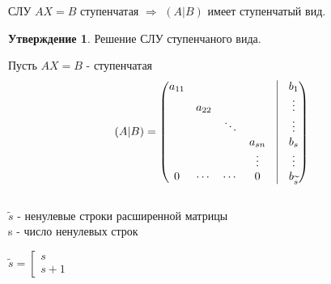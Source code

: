 \documentclass[a4paper, 12pt]{article}
\theoremstyle{definition}
\newtheorem*{subtheorem}{Утверждение}
\begin{document}
  СЛУ $AX=B$ ступенчатая $\Longrightarrow $ $(A|B)$ имеет ступенчатый вид.

  \newpage
  \begin{subtheorem}
    Решение СЛУ ступенчаного вида.
  \end{subtheorem}  
  Пусть $AX=B$ - ступенчатая
  $$(A|B)=\begin{pmatrix}
    a_{11} & \null & \null & \null & \vline & b_1 \\
    \null & a_{22} & \null & \null & \vline & \vdots \\
    \null & \null & \ddots & \null & \vline & \vdots \\
    \null & \null & \null & a_{sn} & \vline & b_s \\
    \null & \null & \null & \vdots & \vline & \vdots \\
    0 & \cdots & \cdots & 0 & \vline & b_{\widetilde{s}}
  \end{pmatrix}$$ \\
  $\widetilde{s}$ - ненулевые строки расширенной матрицы \\
  s - число ненулевых строк 

  $\widetilde{s}=\left[
    \begin{gathered}
      s \\
      s+1
    \end{gathered}
  \right.$
\end{document}
